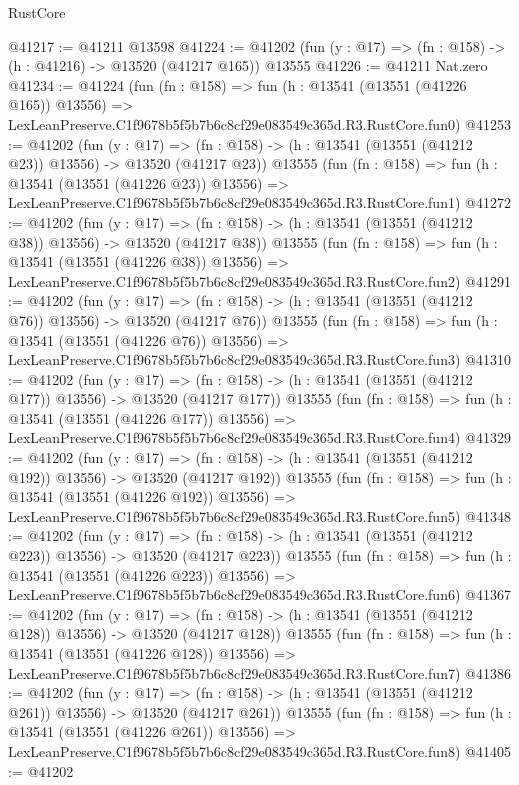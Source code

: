 \begin{lexlean}{RustCore}
\begin{coremodule}
@41217 := @41211 @13598
@41224 := @41202 (fun (y : @17) => (fn : @158) -> (h : @41216) -> @13520 (@41217 @165)) @13555
@41226 := @41211 Nat.zero
@41234 := @41224
    (fun (fn : @158) =>
    fun (h : @13541 (@13551 (@41226 @165)) @13556) =>
    LexLeanPreserve.C1f9678b5f5b7b6c8cf29e083549c365d.R3.RustCore.fun0)
@41253 := @41202
    (fun (y : @17) =>
    (fn : @158) -> (h : @13541 (@13551 (@41212 @23)) @13556) -> @13520 (@41217 @23))
    @13555
    (fun (fn : @158) =>
    fun (h : @13541 (@13551 (@41226 @23)) @13556) =>
    LexLeanPreserve.C1f9678b5f5b7b6c8cf29e083549c365d.R3.RustCore.fun1)
@41272 := @41202
    (fun (y : @17) =>
    (fn : @158) -> (h : @13541 (@13551 (@41212 @38)) @13556) -> @13520 (@41217 @38))
    @13555
    (fun (fn : @158) =>
    fun (h : @13541 (@13551 (@41226 @38)) @13556) =>
    LexLeanPreserve.C1f9678b5f5b7b6c8cf29e083549c365d.R3.RustCore.fun2)
@41291 := @41202
    (fun (y : @17) =>
    (fn : @158) -> (h : @13541 (@13551 (@41212 @76)) @13556) -> @13520 (@41217 @76))
    @13555
    (fun (fn : @158) =>
    fun (h : @13541 (@13551 (@41226 @76)) @13556) =>
    LexLeanPreserve.C1f9678b5f5b7b6c8cf29e083549c365d.R3.RustCore.fun3)
@41310 := @41202
    (fun (y : @17) =>
    (fn : @158) -> (h : @13541 (@13551 (@41212 @177)) @13556) -> @13520 (@41217 @177))
    @13555
    (fun (fn : @158) =>
    fun (h : @13541 (@13551 (@41226 @177)) @13556) =>
    LexLeanPreserve.C1f9678b5f5b7b6c8cf29e083549c365d.R3.RustCore.fun4)
@41329 := @41202
    (fun (y : @17) =>
    (fn : @158) -> (h : @13541 (@13551 (@41212 @192)) @13556) -> @13520 (@41217 @192))
    @13555
    (fun (fn : @158) =>
    fun (h : @13541 (@13551 (@41226 @192)) @13556) =>
    LexLeanPreserve.C1f9678b5f5b7b6c8cf29e083549c365d.R3.RustCore.fun5)
@41348 := @41202
    (fun (y : @17) =>
    (fn : @158) -> (h : @13541 (@13551 (@41212 @223)) @13556) -> @13520 (@41217 @223))
    @13555
    (fun (fn : @158) =>
    fun (h : @13541 (@13551 (@41226 @223)) @13556) =>
    LexLeanPreserve.C1f9678b5f5b7b6c8cf29e083549c365d.R3.RustCore.fun6)
@41367 := @41202
    (fun (y : @17) =>
    (fn : @158) -> (h : @13541 (@13551 (@41212 @128)) @13556) -> @13520 (@41217 @128))
    @13555
    (fun (fn : @158) =>
    fun (h : @13541 (@13551 (@41226 @128)) @13556) =>
    LexLeanPreserve.C1f9678b5f5b7b6c8cf29e083549c365d.R3.RustCore.fun7)
@41386 := @41202
    (fun (y : @17) =>
    (fn : @158) -> (h : @13541 (@13551 (@41212 @261)) @13556) -> @13520 (@41217 @261))
    @13555
    (fun (fn : @158) =>
    fun (h : @13541 (@13551 (@41226 @261)) @13556) =>
    LexLeanPreserve.C1f9678b5f5b7b6c8cf29e083549c365d.R3.RustCore.fun8)
@41405 := @41202

\end{coremodule}
\end{lexlean}
